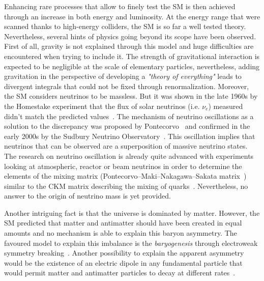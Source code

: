 	Enhancing rare processes that allow to finely test the \acl{SM} is then achieved through an increase in both energy and luminosity. At the energy range that were scanned thanks to high-energy colliders, the SM is so far a well tested theory. Nevertheless, several hints of physics going beyond its scope have been observed. First of all, gravity is not explained through this model and huge difficulties are encountered when trying to include it. The strength of gravitational interaction is expected to be negligible at the scale of elementary particles, nevertheless, adding gravitation in the perspective of developing a \textit{"theory of everything"} leads to divergent integrals that could not be fixed through renormalization. Moreover, the SM considers neutrinos to be massless. But it was shown in the late 1960s by the Homestake experiment that the flux of solar neutrinos (i.e. $\nu_e$) measured didn't match the predicted values~\cite{DAVIS1968}. The mechanism of neutrino oscillations as a solution to the discrepancy was proposed by Pontecorvo~\cite{PONTECORVO1968} and confirmed in the early 2000s by the Sudbury Neutrino Observatory~\cite{SNO2002}. This oscillation implies that neutrinos that can be observed are a superposition of massive neutrino states. The research on neutrino oscillation is already quite advanced with experiments looking at atmospheric, reactor or beam neutrinos in order to determine the elements of the mixing matrix (Pontecorvo–Maki–Nakagawa–Sakata matrix~\cite{MNS1962}) similar to the \acf{CKM} matrix describing the mixing of quarks~\cite{KOBAYASHI1973}. Nevertheless, no answer to the origin of neutrino mass is yet provided.
	
	Another intriguing fact is that the universe is dominated by matter. However, the SM predicted that matter and antimatter should have been created in equal amounts and no mechanism is able to explain this baryon asymmetry. The favoured model to explain this imbalance is the \textit{baryogenesis} through electroweak symmetry breaking~\cite{KUZMIN1985,CANETTI2012}. Another possibility to explain the apparent asymmetry would be the existence of an electric dipole in any fundamental particle that would permit matter and antimatter particles to decay at different rates~\cite{ACME2014}.
	
